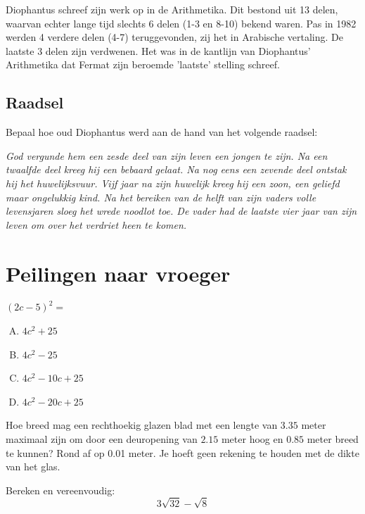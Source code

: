 \documentclass[12pt]{article}
\begin{document}
Diophantus schreef zijn werk op in de Arithmetika. Dit bestond uit 13 delen, waarvan echter lange tijd slechts 6 delen (1-3 en 8-10) bekend waren. Pas in 1982 werden 4 verdere delen (4-7) teruggevonden, zij het in Arabische vertaling. De laatste 3 delen zijn verdwenen. Het was in de kantlijn van Diophantus' Arithmetika dat Fermat zijn beroemde 'laatste' stelling schreef.

\subsection*{Raadsel}

Bepaal hoe oud Diophantus werd aan de hand van het volgende raadsel:

{\em God vergunde hem een zesde deel van zijn leven een jongen te zijn. Na een twaalfde deel kreeg hij een bebaard gelaat. Na nog eens een zevende deel ontstak hij het huwelijksvuur. Vijf jaar na zijn huwelijk kreeg hij een zoon, een geliefd maar ongelukkig kind. Na het bereiken van de helft van zijn vaders volle levensjaren sloeg het wrede noodlot toe. De vader had de laatste vier jaar van zijn leven om over het verdriet heen te komen. }

\section*{Peilingen naar vroeger}

\begin{oefening}
$(2c-5)^2=$
\begin{center}
\begin{enumerate}[(A)]
  \item $4c^2+25$
  \item $4c^2-25$
  \item $4c^2-10c+25$
  \item $4c^2-20c+25$
\end{enumerate}
\end{center}
\end{oefening}

\begin{oefening}
Hoe breed mag een rechthoekig glazen blad met een lengte van $3.35$ meter maximaal zijn om door een deuropening van $2.15$ meter hoog en $0.85$ meter breed te kunnen? Rond af op 0.01 meter. Je hoeft geen rekening te houden met de dikte van het glas.
\end{oefening}

\begin{oefening}
Bereken en vereenvoudig: $$3\sqrt{32}-\sqrt{8}$$
\end{oefening}
\end{document}
